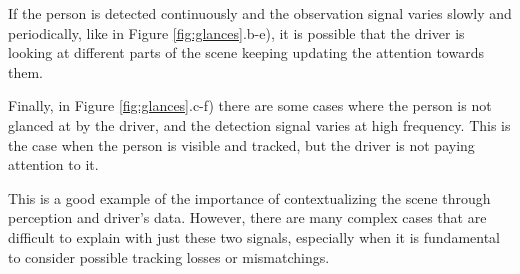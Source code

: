 If the person is detected continuously and the observation signal varies slowly 
and periodically, like in Figure \ref{fig:glances}.b-e), it is possible that the 
driver is looking at different parts of the scene keeping updating the attention 
towards them.

Finally, in Figure \ref{fig:glances}.c-f) there are some cases where the person 
is not glanced at by the driver, and the detection signal varies at high 
frequency. This is the case when the person is visible and tracked, but the driver 
is not paying attention to it. 

This is a good example of the importance of contextualizing the scene through 
perception and driver's data. However, there are many complex cases that are 
difficult to explain with just these two signals, especially when it is 
fundamental to consider possible tracking losses or mismatchings.

